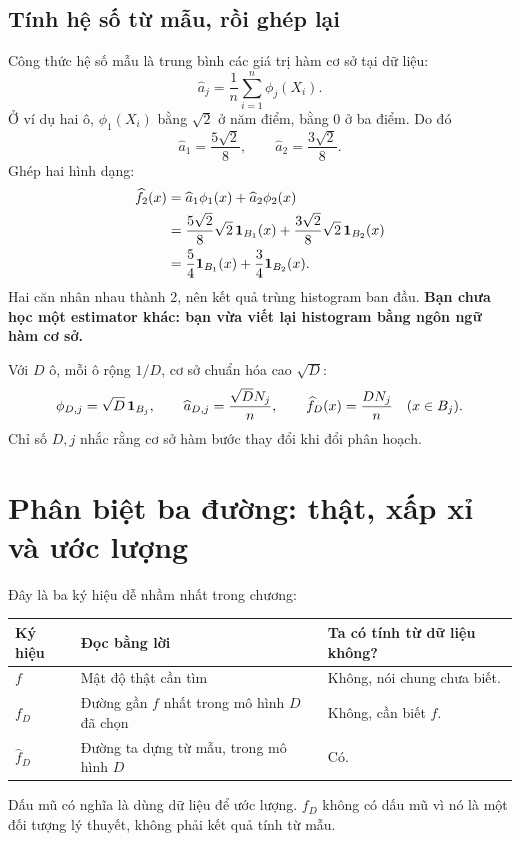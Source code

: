 \subsection{Tính hệ số từ mẫu, rồi ghép lại}
Công thức hệ số mẫu là trung bình các giá trị hàm cơ sở tại dữ liệu:
\[
\widehat a_j=\frac1n\sum_{i=1}^n\phi_j(X_i).
\]
Ở ví dụ hai ô, $\phi_1(X_i)$ bằng $\sqrt2$ ở năm điểm, bằng 0 ở ba
điểm. Do đó
\[
\widehat a_1=\frac{5\sqrt2}{8},\qquad
\widehat a_2=\frac{3\sqrt2}{8}.
\]
Ghép hai hình dạng:
\begin{align*}
\widehat f_2(x)
&=\widehat a_1\phi_1(x)+\widehat a_2\phi_2(x)\\
&=\frac{5\sqrt2}{8}\sqrt2\,\mathbf 1_{B_1}(x)
 +\frac{3\sqrt2}{8}\sqrt2\,\mathbf 1_{B_2}(x)\\
&=\frac54\mathbf 1_{B_1}(x)+\frac34\mathbf 1_{B_2}(x).
\end{align*}
Hai căn nhân nhau thành 2, nên kết quả trùng histogram ban đầu.
\textbf{Bạn chưa học một estimator khác: bạn vừa viết lại histogram
bằng ngôn ngữ hàm cơ sở.}

Với $D$ ô, mỗi ô rộng $1/D$, cơ sở chuẩn hóa cao $\sqrt D$:
\[
\phi_{D,j}=\sqrt D\,\mathbf 1_{B_j},\qquad
\widehat a_{D,j}=\frac{\sqrt D N_j}{n},\qquad
\widehat f_D(x)=\frac{DN_j}{n}\quad(x\in B_j).
\]
Chỉ số $D,j$ nhắc rằng cơ sở hàm bước thay đổi khi đổi phân hoạch.

\section{Phân biệt ba đường: thật, xấp xỉ và ước lượng}
Đây là ba ký hiệu dễ nhầm nhất trong chương:
\begin{center}
\begin{tabular}{p{}p{}p{}}
\toprule Ký hiệu & Đọc bằng lời & Ta có tính từ dữ liệu không?\\\midrule
$f$ & Mật độ thật cần tìm & Không, nói chung chưa biết.\\[3pt]
$f_D$ & Đường gần $f$ nhất trong mô hình $D$ đã chọn & Không, cần biết $f$.\\[3pt]
$\widehat f_D$ & Đường ta dựng từ mẫu, trong mô hình $D$ & Có.\\\bottomrule
\end{tabular}
\end{center}
Dấu mũ có nghĩa là dùng dữ liệu để ước lượng. $f_D$ không có dấu mũ vì
nó là một đối tượng lý thuyết, không phải kết quả tính từ mẫu.

